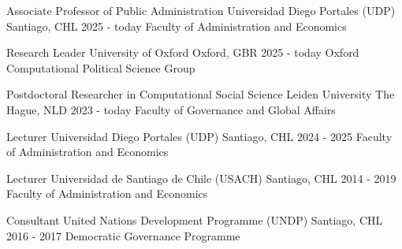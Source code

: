






\begin{cventries}
\cventry
{Associate Professor of Public Administration} 
{Universidad Diego Portales (UDP)} 
{Santiago, CHL} 
{2025 - today}
{Faculty of Administration and Economics} \vspace{1.5mm}

\cventry
{Research Leader} 
{University of Oxford} 
{Oxford, GBR} 
{2025 - today}
{Oxford Computational Political Science Group} \vspace{1.5mm}

\cventry
{Postdoctoral Researcher in Computational Social Science} 
{Leiden University} 
{The Hague, NLD} 
{2023 - today}
{Faculty of Governance and Global Affairs} \vspace{1.5mm}

\cventry
{Lecturer} 
{Universidad Diego Portales (UDP)} 
{Santiago, CHL} 
{2024 - 2025}
{Faculty of Administration and Economics} \vspace{1.5mm}

\cventry
{Lecturer} 
{Universidad de Santiago de Chile (USACH)} 
{Santiago, CHL} 
{2014 - 2019}
{Faculty of Administration and Economics} \vspace{1.5mm}


\cventry
{Consultant} 
{United Nations Development Programme (UNDP)} 
{Santiago, CHL} 
{2016 - 2017}
{Democratic Governance Programme} %

\end{cventries}
